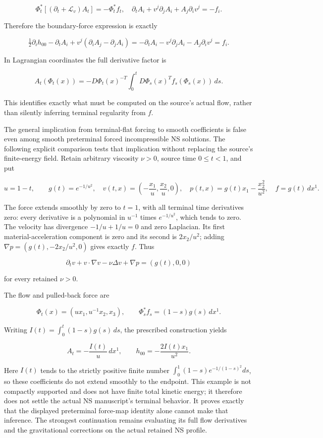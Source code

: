 \documentclass[10pt,a4paper,oneside]{report}
\begin{document}
\[
\Phi_t^*[(\partial_t+\mathcal L_v)A_t]=-\Phi_t^*f_t,
\quad
\partial_tA_i+v^j\partial_jA_i+A_j\partial_iv^j=-f_i.
\]

Therefore the boundary-force expression is exactly

\[
\tfrac12\partial_i h_{00}-\partial_tA_i
+v^j(\partial_iA_j-\partial_jA_i)
=-\partial_tA_i-v^j\partial_jA_i-A_j\partial_iv^j=f_i.
\]

In Lagrangian coordinates the full derivative factor is

\[
A_t(\Phi_t(x))
=-D\Phi_t(x)^{-T}
\int_0^tD\Phi_s(x)^Tf_s(\Phi_s(x))\,ds.
\]

This identifies exactly what must be computed on the source's actual
flow, rather than silently inferring terminal regularity from \(f\).

The general implication from terminal-flat forcing to smooth
coefficients is false even among smooth preterminal forced
incompressible NS solutions. The following explicit comparison tests
that implication without replacing the source's finite-energy field.
Retain arbitrary viscosity \(\nu>0\), source time \(0\le t<1\), and put

\[
u=1-t,\qquad g(t)=e^{-1/u^2},
\quad v(t,x)=\left(-\frac{x_1}{u},\frac{x_2}{u},0\right),
\quad p(t,x)=g(t)x_1-\frac{x_2^2}{u^2},
\quad f=g(t)\,dx^1.
\]

The force extends smoothly by zero to \(t=1\), with all terminal time
derivatives zero: every derivative is a polynomial in \(u^{-1}\) times
\(e^{-1/u^2}\), which tends to zero. The velocity has divergence
\(-1/u+1/u=0\) and zero Laplacian. Its first material-acceleration
component is zero and its second is \(2x_2/u^2\); adding
\(\nabla p=(g(t),-2x_2/u^2,0)\) gives exactly \(f\). Thus

\[
\partial_tv+v\cdot\nabla v-\nu\Delta v+\nabla p=(g(t),0,0)
\]

for every retained \(\nu>0\).

The flow and pulled-back force are

\[
\Phi_t(x)=(ux_1,u^{-1}x_2,x_3),
\qquad \Phi_s^*f_s=(1-s)g(s)\,dx^1.
\]

Writing \(I(t)=\int_0^t(1-s)g(s)\,ds\), the prescribed construction
yields

\[
A_t=-\frac{I(t)}u\,dx^1,
\qquad h_{00}=-\frac{2I(t)x_1}{u^2}.
\]

Here \(I(t)\) tends to the strictly positive finite number
\(\int_0^1(1-s)e^{-1/(1-s)^2}ds\), so these coefficients do not extend
smoothly to the endpoint. This example is not compactly supported and
does not have finite total kinetic energy; it therefore does not settle
the actual NS manuscript's terminal behavior. It proves exactly that the
displayed preterminal force-map identity alone cannot make that
inference. The strongest continuation remains evaluating its full flow
derivatives and the gravitational corrections on the actual retained NS
profile.
\end{document}
